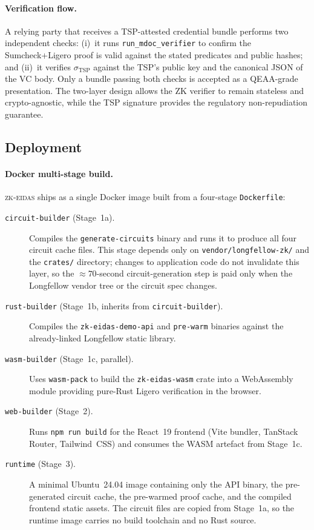 \paragraph{Verification flow.}
A relying party that receives a TSP-attested credential bundle performs two independent checks:
(i)~it runs \texttt{run\_mdoc\_verifier} to confirm the Sumcheck+Ligero proof is valid against
the stated predicates and public hashes; and
(ii)~it verifies $\sigma_{\mathrm{TSP}}$ against the TSP's public key and the canonical JSON
of the VC body.
Only a bundle passing both checks is accepted as a QEAA-grade presentation.
The two-layer design allows the ZK verifier to remain stateless and crypto-agnostic, while
the TSP signature provides the regulatory non-repudiation guarantee.

\subsection{Deployment}\label{sec:impl-deploy}

\paragraph{Docker multi-stage build.}
\textsc{zk-eidas} ships as a single Docker image built from a four-stage \texttt{Dockerfile}:

\begin{description}
  \item[\texttt{circuit-builder} (Stage~1a).] Compiles the \texttt{generate-circuits} binary and
    runs it to produce all four circuit cache files.
    This stage depends only on \texttt{vendor/longfellow-zk/} and the \texttt{crates/} directory;
    changes to application code do not invalidate this layer, so the ${\approx}70$-second
    circuit-generation step is paid only when the Longfellow vendor tree or the circuit spec
    changes.

  \item[\texttt{rust-builder} (Stage~1b, inherits from \texttt{circuit-builder}).] Compiles the
    \texttt{zk-eidas-demo-api} and \texttt{pre-warm} binaries against the already-linked
    Longfellow static library.

  \item[\texttt{wasm-builder} (Stage~1c, parallel).] Uses \texttt{wasm-pack} to build the
    \texttt{zk-eidas-wasm} crate into a WebAssembly module providing pure-Rust Ligero
    verification in the browser.

  \item[\texttt{web-builder} (Stage~2).] Runs \texttt{npm run build} for the React~19
    frontend (Vite bundler, TanStack Router, Tailwind~CSS) and consumes the WASM artefact
    from Stage~1c.

  \item[\texttt{runtime} (Stage~3).] A minimal Ubuntu~24.04 image containing only the API
    binary, the pre-generated circuit cache, the pre-warmed proof cache, and the compiled
    frontend static assets.
    The circuit files are copied from Stage~1a, so the runtime image carries no build
    toolchain and no Rust source.
\end{description}


